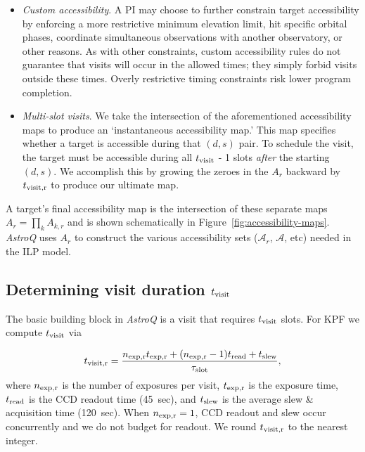 \documentclass[twocolumn,linenumbers]{aastex63}
\newcommand{\AstroQ}{\textit{AstroQ}\xspace}
\newcommand{\isr}[2]{\ensuremath{#1_{\rm #2}}\xspace}
\begin{document}
\begin{itemize}
\item {\em Custom accessibility}. A PI may choose to further constrain target accessibility by enforcing a more restrictive minimum elevation limit, hit specific orbital phases, coordinate simultaneous observations with another observatory, or other reasons. As with other constraints, custom accessibility rules do not guarantee that visits will occur in the allowed times; they simply forbid visits outside these times. Overly restrictive timing constraints risk lower program completion. 

\item {\em Multi-slot visits}. We take the intersection of the aforementioned accessibility maps to produce an `instantaneous accessibility map.' This map specifies whether a target is accessible during that $(d,s)$ pair. To schedule the visit, the target must be accessible during all \isr{t}{visit} - 1 slots {\em after} the starting $(d,s)$. We accomplish this by growing the zeroes in the $A_r$ backward by \isr{t}{visit,r} to produce our ultimate map. 

\end{itemize}

A target's final accessibility map is the intersection of these separate maps $A_{r} = \prod_k A_{k,r}$ and is shown schematically in Figure~\ref{fig:accessibility-maps}. \AstroQ uses $A_r$ to construct the various accessibility sets ($\mathcal{A}_r$, $\mathcal{A}$, etc) needed in the ILP model.

\subsection{Determining visit duration \isr{t}{visit}}
\label{subsec:t-visit}

The basic building block in \AstroQ is a visit that requires \isr{t}{visit} slots. For KPF we compute \isr{t}{visit} via

\begin{equation}
\isr{t}{visit,r} = 
\frac{
  \isr{n}{exp,r} \isr{t}{exp,r} 
+ (\isr{n}{exp,r} - 1) \isr{t}{read} 
+ \isr{t}{slew}} 
{\isr{\tau}{slot}},
\label{eqn:slotsNeeded}
\end{equation}
%
where \isr{n}{exp,r} is the number of exposures per visit, \isr{t}{exp,r} is the exposure time, \isr{t}{read} is the CCD readout time (45~sec), and \isr{t}{slew} is the average slew \& acquisition time (120~sec). When $\isr{n}{exp,r} = 1$, CCD readout and slew occur concurrently and we do not budget for readout. We round \isr{t}{visit,r} to the nearest integer. 
\end{document}
